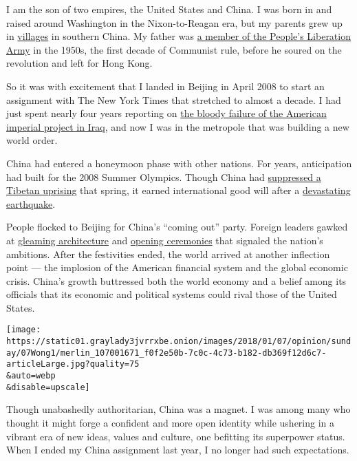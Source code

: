 I am the son of two empires, the United States and China. I was born in
and raised around Washington in the Nixon-to-Reagan era, but my parents
grew up in
\href{http://www.nytimes3xbfgragh.onion/2009/12/04/world/asia/04taishan.html}{villages}
in southern China. My father was
\href{https://www.nytimes3xbfgragh.onion/2017/06/18/world/asia/mongolian-warriors-and-communist-soldiers-a-frontier-town-in-china.html}{a
member of the People's Liberation Army} in the 1950s, the first decade
of Communist rule, before he soured on the revolution and left for Hong
Kong.

So it was with excitement that I landed in Beijing in April 2008 to
start an assignment with The New York Times that stretched to almost a
decade. I had just spent nearly four years reporting on
\href{http://www.nytimes3xbfgragh.onion/2007/06/03/weekinreview/03wong.html}{the
bloody failure of the American imperial project in Iraq}, and now I was
in the metropole that was building a new world order.

China had entered a honeymoon phase with other nations. For years,
anticipation had built for the 2008 Summer Olympics. Though China had
\href{http://www.nytimes3xbfgragh.onion/2008/03/24/world/asia/24tibet.html}{suppressed
a Tibetan uprising} that spring, it earned international good will after
a
\href{http://www.nytimes3xbfgragh.onion/2008/05/13/world/asia/13scene.html}{devastating
earthquake}.

People flocked to Beijing for China's ``coming out'' party. Foreign
leaders gawked at
\href{http://www.nytimes3xbfgragh.onion/2008/07/13/arts/design/13build.html}{gleaming
architecture} and
\href{http://www.nytimes3xbfgragh.onion/2008/08/09/sports/olympics/09china.html}{opening
ceremonies} that signaled the nation's ambitions. After the festivities
ended, the world arrived at another inflection point --- the implosion
of the American financial system and the global economic crisis. China's
growth buttressed both the world economy and a belief among its
officials that its economic and political systems could rival those of
the United States.

\texttt{[image: https://static01.graylady3jvrrxbe.onion/images/2018/01/07/opinion/sunday/07Wong1/merlin\_107001671\_f0f2e50b-7c0c-4c73-b182-db369f12d6c7-articleLarge.jpg?quality=75\\\&auto=webp\\\&disable=upscale]}

Though unabashedly authoritarian, China was a magnet. I was among many
who thought it might forge a confident and more open identity while
ushering in a vibrant era of new ideas, values and culture, one
befitting its superpower status. When I ended my China assignment last
year, I no longer had such expectations.

